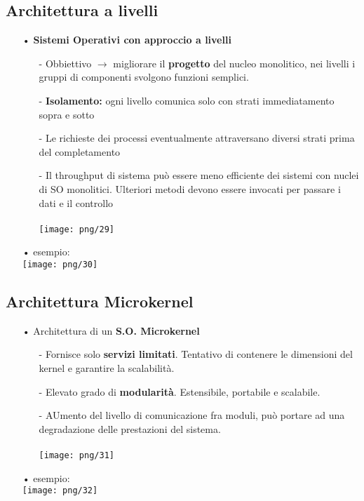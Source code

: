 \documentclass[12pt, letterpaper]{article}
\begin{document}
\subsection{Architettura a livelli}

\begin{itemize}
   \item[•] \textbf{Sistemi Operativi con approccio a livelli}
      \begin{itemize}
         \item[-] Obbiettivo $\rightarrow$ migliorare il \textbf{progetto} del nucleo monolitico, nei livelli i gruppi di componenti svolgono funzioni semplici.
         \item[-] \textbf{Isolamento:} ogni livello comunica solo con strati immediatamento sopra e sotto 
         \item[-] Le richieste dei processi eventualmente attraversano diversi
                  strati prima del completamento
         \item[-] Il throughput di sistema può essere meno efficiente dei sistemi
                  con nuclei di SO monolitici. Ulteriori metodi devono essere invocati per passare i dati e il
                  controllo
                  \\\\
                  \texttt{[image: png/29]}
      \end{itemize}
   \item[•] esempio:
      \\
      \texttt{[image: png/30]}
\end{itemize}

\subsection{Architettura Microkernel}

\begin{itemize}
   \item[•] Architettura di un \textbf{S.O. Microkernel}
      \begin{itemize}
         \item[-] Fornisce solo \textbf{servizi limitati}. Tentativo di contenere le dimensioni del kernel e garantire la scalabilità.
         \item[-] Elevato grado di \textbf{modularità}. Estensibile, portabile e scalabile.
         \item[-] AUmento del livello di comunicazione fra moduli, può portare ad una degradazione delle prestazioni del sistema.
         \\
         \\
         \texttt{[image: png/31]}
      \end{itemize}
   \item[•] esempio:
      \\
      \texttt{[image: png/32]}
\end{itemize}
\end{document}
